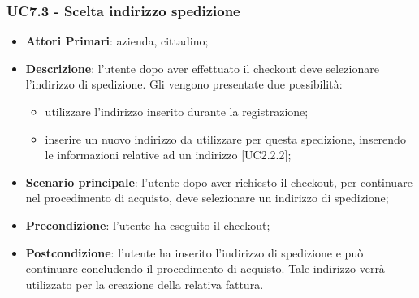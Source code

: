 \subsubsection{UC7.3 - Scelta indirizzo spedizione}
\begin{itemize}
	\item \textbf{Attori Primari}: azienda, cittadino;
	\item \textbf{Descrizione}:
	l'utente dopo aver effettuato il checkout deve selezionare l'indirizzo di spedizione. Gli vengono presentate due possibilità:
	\begin{itemize}
		\item utilizzare l'indirizzo inserito durante la registrazione;
		\item inserire un nuovo indirizzo da utilizzare per questa spedizione, inserendo le informazioni relative ad un indirizzo [UC2.2.2];
	\end{itemize}
	\item \textbf{Scenario principale}: l'utente dopo aver richiesto il checkout, per continuare nel procedimento di acquisto, deve selezionare un indirizzo di spedizione;
	\item \textbf{Precondizione}: l'utente ha eseguito il checkout;
	\item \textbf{Postcondizione}:
	l'utente ha inserito l'indirizzo di spedizione e può continuare concludendo il procedimento di acquisto. Tale indirizzo verrà utilizzato per la creazione della relativa fattura.
\end{itemize}



